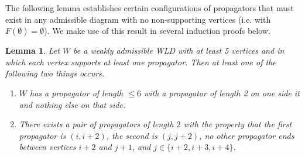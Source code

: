 \documentclass[11pt]{article}
\newtheorem{lem}[thm]{Lemma}
\theoremstyle{remark}
\theoremstyle{definition}
\begin{document}
The following lemma establishes certain configurations of propagators that must exist in any admissible diagram with no non-supporting vertices (i.e. with $F(\emptyset) = \emptyset$). We make use of this result in several induction proofs below. 

\begin{lem}\label{lem sian}
  Let $W$ be a weakly admissible WLD with at least 5 vertices and in which each vertex supports at least one propagator.  Then at least one of the following two things occurs.
  \begin{enumerate}
    \item $W$ has a propagator of length $\leq 6$ with a propagator of length 2 on one side it and nothing else on that side.\label{item big and 2}
    \item There exists a pair of propagators of length $2$ with the property that the first propagator is $(i, i+2)$, the second is $(j, j+2)$, no other propagator ends between vertices $i+2$ and $j+1$, and $j\in\{i+2, i+3, i+4\}$.\label{item pair of 2s}
  \end{enumerate}
\end{lem}
\end{document}
